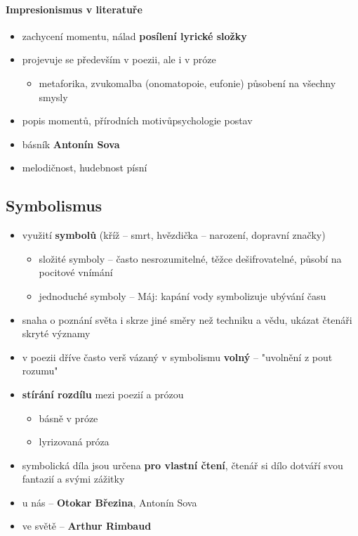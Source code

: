 \paragraph{Impresionismus v literatuře}
\begin{itemize}
\item zachycení momentu, nálad \ra \textbf{posílení lyrické složky}
\item projevuje se především v poezii, ale i v próze
	\begin{itemize}
	\item metaforika, zvukomalba (onomatopoie, eufonie) \ra působení na všechny smysly
	\end{itemize}
\item popis momentů, přírodních motivůpsychologie postav
\item básník \textbf{Antonín Sova}
\item melodičnost, hudebnost písní

\end{itemize}



\subsection{Symbolismus}
\begin{itemize}
\item využití \textbf{symbolů} (kříž -- smrt, hvězdička -- narození, dopravní značky)
	\begin{itemize}
	\item složité symboly -- často nesrozumitelné, těžce dešifrovatelné, působí na pocitové vnímání
	\item jednoduché symboly -- Máj: kapání vody symbolizuje ubývání času
	\end{itemize}
\item snaha o poznání světa i skrze jiné směry než techniku a vědu, ukázat čtenáři skryté významy
\item v poezii  dříve často verš vázaný \ra v symbolismu \textbf{volný} -- "uvolnění z pout rozumu"
\item \textbf{stírání rozdílu} mezi poezií a prózou
	\begin{itemize}
	\item[\ra] básně v próze
	\item[\ra] lyrizovaná próza
	\end{itemize}
\item symbolická díla jsou určena \textbf{pro vlastní čtení}, čtenář si dílo dotváří svou fantazií a svými zážitky
\item u nás -- \textbf{Otokar Březina}, Antonín Sova
\item ve světě -- \textbf{Arthur Rimbaud}
\end{itemize}


